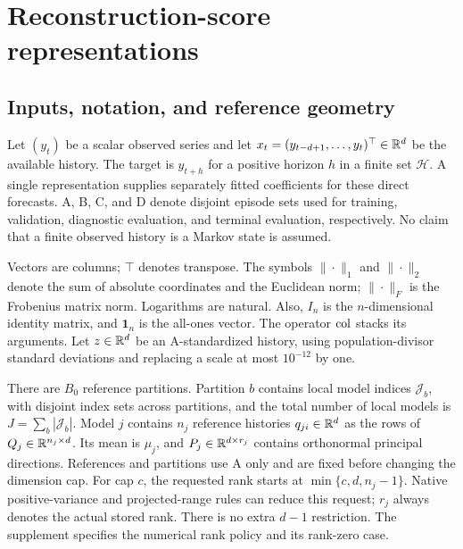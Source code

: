 \section{Reconstruction-score representations}\label{sec:representation}
\subsection{Inputs, notation, and reference geometry}
Let $(y_t)$ be a scalar observed series and let $x_t=(y_{t-d+1},\ldots,y_t)^\top\in\mathbb R^d$ be the available history. The target is $y_{t+h}$ for a positive horizon $h$ in a finite set $\mathcal H$. A single representation supplies separately fitted coefficients for these direct forecasts. A, B, C, and D denote disjoint episode sets used for training, validation, diagnostic evaluation, and terminal evaluation, respectively. No claim that a finite observed history is a Markov state is assumed.

Vectors are columns; $\top$ denotes transpose. The symbols $\|\cdot\|_1$ and $\|\cdot\|_2$ denote the sum of absolute coordinates and the Euclidean norm; $\|\cdot\|_F$ is the Frobenius matrix norm. Logarithms are natural. Also, $I_n$ is the $n$-dimensional identity matrix, and $\mathbf1_n$ is the all-ones vector. The operator $\operatorname{col}$ stacks its arguments. Let $z\in\mathbb R^d$ be an A-standardized history, using population-divisor standard deviations and replacing a scale at most $10^{-12}$ by one.

There are $B_0$ reference partitions. Partition $b$ contains local model indices $\mathcal J_b$, with disjoint index sets across partitions, and the total number of local models is $J=\sum_b|\mathcal J_b|$. Model $j$ contains $n_j$ reference histories $q_{ji}\in\mathbb R^d$ as the rows of $Q_j\in\mathbb R^{n_j\times d}$. Its mean is $\mu_j$, and $P_j\in\mathbb R^{d\times r_j}$ contains orthonormal principal directions. References and partitions use A only and are fixed before changing the dimension cap. For cap $c$, the requested rank starts at $\min\{c,d,n_j-1\}$. Native positive-variance and projected-range rules can reduce this request; $r_j$ always denotes the actual stored rank. There is no extra $d-1$ restriction. The supplement specifies the numerical rank policy and its rank-zero case.

